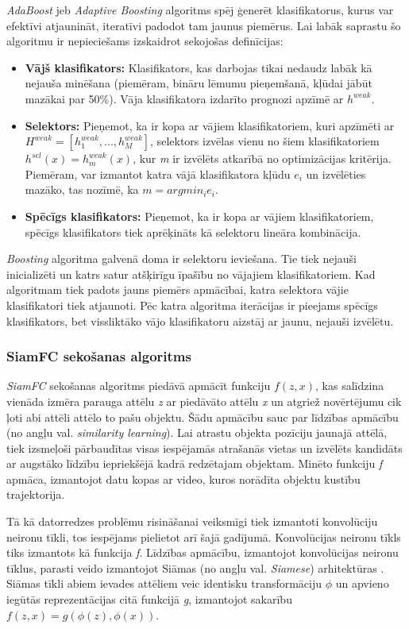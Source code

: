 \textit{AdaBoost} jeb \textit{Adaptive Boosting} algoritms spēj ģenerēt klasifikatorus, kurus var efektīvi atjaunināt, iteratīvi padodot tam jaunus piemērus. Lai labāk saprastu šo algoritmu ir nepieciešams izskaidrot sekojošas definīcijas:
\begin{itemize}
	\item \textbf{Vājš klasifikators:} Klasifikators, kas darbojas tikai nedaudz labāk kā nejauša minēšana (piemēram, bināru lēmumu pieņemšanā, kļūdai jābūt mazākai par 50\%). Vāja klasifikatora izdarīto prognozi apzīmē ar $h^{weak}$.
	\item \textbf{Selektors:} Pieņemot, ka ir kopa ar vājiem klasifikatoriem, kuri apzīmēti ar $H^{weak} = [h^{weak}_1,...,h^{weak}_M]$, selektors izvēlas vienu no šiem klasifikatoriem $h^{sel}(x) = h^{weak}_m(x)$, kur \textit{m} ir izvēlēts atkarībā no optimizācijas kritērija. Piemēram, var izmantot katra vājā klasifikatora kļūdu $e_i$ un izvēlēties mazāko, tas nozīmē, ka $m = argmin_ie_i$.
	\item \textbf{Spēcīgs klasifikators:} Pieņemot, ka ir kopa ar vājiem klasifikatoriem, spēcīgs klasifikators tiek aprēķināts kā selektoru lineāra kombinācija. 
\end{itemize}

\textit{Boosting} algoritma galvenā doma ir selektoru ieviešana. Tie tiek nejauši inicializēti un katrs satur atšķirīgu īpašību no vājajiem klasifikatoriem. Kad algoritmam tiek padots jauns piemērs apmācībai, katra selektora vājie klasifikatori tiek atjaunoti. Pēc katra algoritma iterācijas ir pieejams spēcīgs klasifikators, bet vissliktāko vājo klasifikatoru aizstāj ar jaunu, nejauši izvēlētu.

\subsubsection{SiamFC sekošanas algoritms}
\textit{SiamFC} sekošanas algoritms piedāvā apmācīt funkciju $f(z,x)$, kas salīdzina vienāda izmēra parauga attēlu \textit{z} ar piedāvāto attēlu \textit{x} un atgriež novērtējumu cik ļoti abi attēli attēlo to pašu objektu. Šādu apmācību sauc par līdzības apmācību (no angļu val. \textit{similarity learning}). Lai atrastu objekta pozīciju jaunajā attēlā, tiek izsmeļoši pārbaudītas visas iespējamās atrašanās vietas un izvēlēts kandidāts ar augstāko līdzību iepriekšējā kadrā redzētajam objektam. Minēto funkciju \textit{f} apmāca, izmantojot datu kopas ar video, kuros norādīta objektu kustību trajektorija. 

Tā kā datorredzes problēmu risināšanai veiksmīgi tiek izmantoti konvolūciju neironu tīkli, tos iespējams pielietot arī šajā gadījumā. Konvolūcijas neironu tīkls tiks izmantots kā funkcija \textit{f}. Līdzības apmācību, izmantojot konvolūcijas neironu tīklus, parasti veido izmantojot Siāmas (no angļu val. \textit{Siamese}) arhitektūras \cite{taigman2014closing,bromley1994signature}. Siāmas tīkli abiem ievades attēliem veic identisku transformāciju $\phi$ un apvieno iegūtās reprezentācijas citā funkcijā \textit{g}, izmantojot sakarību $f(z,x) = g(\phi(z),\phi(x))$.


